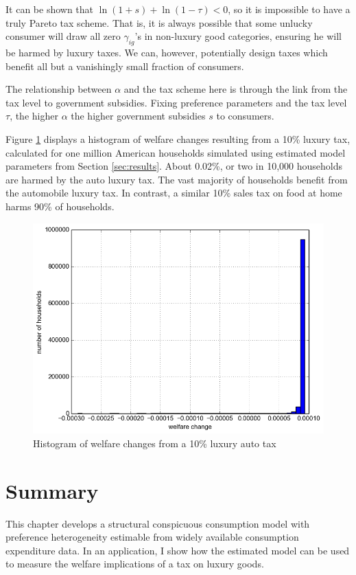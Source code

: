 It can be shown that $\ln(1+s) + \ln(1 - \tau) < 0$, so it is impossible to have a truly Pareto tax scheme.  That is, it is always possible that some unlucky consumer will draw all zero $\gamma_{ig}$'s in non-luxury good categories, ensuring he will be harmed by luxury taxes.  We can, however, potentially design taxes which benefit all but a vanishingly small fraction of consumers.

The relationship between $\alpha$ and the tax scheme here is through the link from the tax level to government subsidies.  Fixing preference parameters and the tax level $\tau$, the higher $\alpha$ the higher government subsidies $s$ to consumers.

Figure \ref{fig:wel_change_10} displays a histogram of welfare changes resulting from a 10\% luxury tax, calculated for one million American households simulated using estimated model parameters from Section \ref{sec:results}.  About 0.02\%, or two in 10,000 households are harmed by the auto luxury tax.  The vast majority of households benefit from the automobile luxury tax.  In contrast, a similar 10\% sales tax on food at home harms 90\% of households.

\begin{figure}
    \centering
	\includegraphics[scale=.6]{pics/tax_hist_Car10.png}
    \caption{Histogram of welfare changes from a 10\% luxury auto tax}
    \label{fig:wel_change_10}
\end{figure}

\section{Summary}
This chapter develops a structural conspicuous consumption model with preference heterogeneity estimable from widely available consumption expenditure data.  In an application, I show how the estimated model can be used to measure the welfare implications of a tax on luxury goods.

